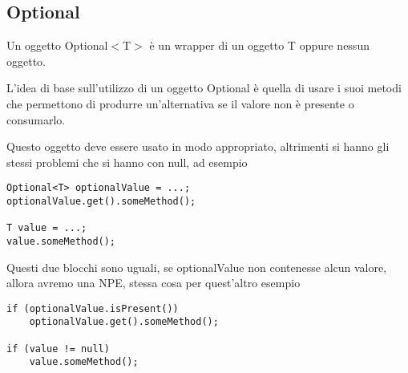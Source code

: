\subsection{Optional}
Un oggetto Optional$<$T$>$ è un wrapper di un oggetto T oppure nessun oggetto.

L'idea di base sull’utilizzo di un oggetto Optional è quella di usare i suoi metodi che permettono di produrre un’alternativa se il valore non è presente o consumarlo.

Questo oggetto deve essere usato in modo appropriato, altrimenti si hanno gli stessi problemi che si hanno con null, ad esempio
\begin{lstlisting}
Optional<T> optionalValue = ...;
optionalValue.get().someMethod();

T value = ...;
value.someMethod();
\end{lstlisting}

Questi due blocchi sono uguali, se optionalValue non contenesse alcun valore, allora avremo una NPE, stessa cosa per quest'altro esempio
\begin{lstlisting}
if (optionalValue.isPresent())
    optionalValue.get().someMethod();

if (value != null)
    value.someMethod();
\end{lstlisting}


